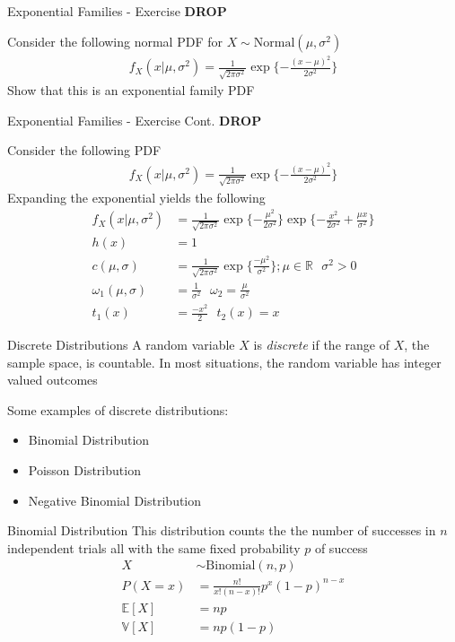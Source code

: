 \documentclass{beamer}
\begin{document}
\begin{frame}{Exponential Families - Exercise}
\textbf{DROP}

Consider the following normal PDF for $X\sim\mathrm{Normal}(\mu, \sigma^{2})$
\begin{align*}
f_{X}(x|\mu, \sigma^{2}) = \frac{1}{\sqrt{2\pi\sigma^{2}}}\exp\{-\frac{(x-\mu)^{2}}{2\sigma^{2}}\} 
\end{align*}
Show that this is an exponential family PDF
\end{frame}

\begin{frame}{Exponential Families - Exercise Cont.}
\textbf{DROP}

Consider the following PDF
\begin{align*}
f_{X}(x|\mu, \sigma^{2}) = \frac{1}{\sqrt{2\pi\sigma^{2}}}\exp\{-\frac{(x-\mu)^{2}}{2\sigma^{2}}\} 
\end{align*}
Expanding the exponential yields the following
\begin{align*}
f_{X}(x|\mu, \sigma^{2}) &= \frac{1}{\sqrt{2\pi\sigma^{2}}}\exp\{-\frac{\mu^{2}}{2\sigma^{2}}\} \exp\{ -\frac{x^{2}}{2\sigma^{2}} + \frac{\mu x}{\sigma^{2}}\}\\
h(x) &= 1\\
c(\mu, \sigma)  &= \frac{1}{\sqrt{2\pi\sigma^{2}}}\exp\{\frac{-\mu^{2}}{\sigma^{2}}\}; \mu\in\mathbb{R}\>\>\>\sigma^{2}>0\\
\omega_{1}(\mu, \sigma) &= \frac{1}{\sigma^{2}}\>\>\>\omega_{2} = \frac{\mu}{\sigma^{2}} \\
t_{1}(x) &= \frac{-x^{2}}{2} \>\>\> t_{2}(x) = x
\end{align*}
\end{frame}


\begin{frame}{Discrete Distributions}
A random variable $X$ is \emph{discrete} if the range of $X$, the sample space, is countable. In most situations, the random variable has integer valued outcomes
\newline

Some examples of discrete distributions:
\begin{itemize}
\item{Binomial Distribution}
\item{Poisson Distribution}
\item{Negative Binomial Distribution}
\end{itemize}
\end{frame}


\begin{frame}{Binomial Distribution}
This distribution counts the the number of successes in $n$ independent trials all with the same fixed probability $p$ of success
\begin{align*}
X &\sim \mathrm{Binomial}(n, p) \\
P(X  = x) &= \frac{n!}{x!(n-x)!} p^{x}(1-p)^{n-x} \\
\mathbb{E}[X] &= np \\
\mathbb{V}[X] &= n p (1-p)
\end{align*}
\end{frame}
\end{document}
